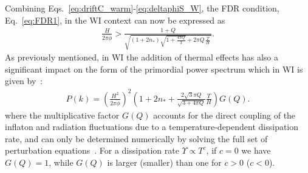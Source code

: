 \documentclass[a4paper,11pt]{article}
\begin{document}
Combining Eqs.~\eqref{eq:driftC_warm}-\eqref{eq:deltaphiS_W}, the FDR
condition, Eq.~\eqref{eq:FDR1}, in the WI context can now be expressed
as
%
\begin{eqnarray}
    \frac{H}{2\pi
      \dot{\phi}}>\frac{1+Q}{\sqrt{(1+2n_*)\sqrt{1+\frac{4\pi
            Q}{3}}+2\pi Q \,\frac{T}{H}\, }}. \label{eq:FDR_warmv0}
\end{eqnarray}
As previously mentioned, in WI the addition of
thermal effects has also a significant impact on the form of the primordial power spectrum which in WI is given by~\cite{Kamali:2023lzq}:
%
\begin{eqnarray}
    P(k)=\left(\frac{H^{2}}{2 \pi \dot{\phi}}\right)^2\left(1 + 2
    n_{*}+\frac{2 \sqrt{3} \pi Q}{\sqrt{3+4 \pi Q}} \frac{T}{H}\right)
    G(Q).\label{eq:DeltaR_warm}
\end{eqnarray}
%
where the multiplicative factor $G(Q)$ accounts for the 
direct coupling of the inflaton and radiation fluctuations due to a temperature-dependent dissipation rate, and can only be determined numerically by solving the full set of perturbation equations~\cite{Graham:2009bf, Bastero-Gil:2011rva,Montefalcone:2023pvh}. For a dissipation rate $\Upsilon\propto T^c$, if $c=0$ we have $G(Q)=1$, while $G(Q)$ is larger (smaller) than one for $c >0$ ($c<0$).  
\end{document}
